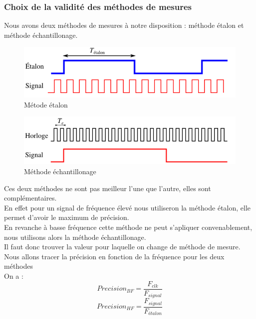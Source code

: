 \documentclass[a4paper,11pt]{article}
\begin{document}
\subsubsection{Choix de la validité des méthodes de mesures}
Nous avons deux méthodes de mesures à notre disposition : méthode étalon et méthode échantillonage.\\
\begin{figure}[H]
\begin{center}
	\includegraphics[scale=.3]{etalon.png}
	\caption{Métode étalon}
\end{center}
\end{figure}

\begin{figure}[H]
\begin{center}
	\includegraphics[scale=.3]{ech.png}
	\caption{Méthode échantillonage}
\end{center}
\end{figure}
Ces deux méthodes ne sont pas meilleur l'une que l'autre, elles sont complémentaires.\\
En effet pour un signal de fréquence élevé nous utiliseron la méthode étalon, elle permet d'avoir le maximum de précision.\\
En revanche à basse fréquence cette méthode ne peut s'apliquer convenablement, nous utilisons alors la méthode échantillonage.\\

Il faut donc trouver la valeur pour laquelle on change de méthode de mesure. Nous allons tracer la précision en fonction de la fréquence pour 
les deux méthodes\\
On a :
\begin{equation*}
 Precision_{BF}=\frac{F_{clk}}{F_{signal}}
\end{equation*}
\begin{equation*}
 Precision_{HF}=\frac{F_{signal}}{F_{étalon}}
\end{equation*}
\end{document}
